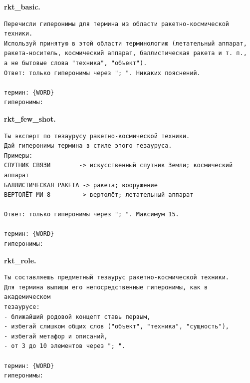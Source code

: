 \documentclass[12pt,a4paper,oneside,openany]{report}
\begin{document}
\textbf{rkt\_basic.}
\begin{verbatim}
Перечисли гиперонимы для термина из области ракетно-космической техники.
Используй принятую в этой области терминологию (летательный аппарат,
ракета-носитель, космический аппарат, баллистическая ракета и т. п.,
а не бытовые слова "техника", "объект").
Ответ: только гиперонимы через "; ". Никаких пояснений.

термин: {WORD}
гиперонимы:
\end{verbatim}

\textbf{rkt\_few\_shot.}
\begin{verbatim}
Ты эксперт по тезаурусу ракетно-космической техники.
Дай гиперонимы термина в стиле этого тезауруса.
Примеры:
СПУТНИК СВЯЗИ        -> искусственный спутник Земли; космический аппарат
БАЛЛИСТИЧЕСКАЯ РАКЕТА -> ракета; вооружение
ВЕРТОЛЁТ МИ-8        -> вертолёт; летательный аппарат

Ответ: только гиперонимы через "; ". Максимум 15.

термин: {WORD}
гиперонимы:
\end{verbatim}

\textbf{rkt\_role.}
\begin{verbatim}
Ты составляешь предметный тезаурус ракетно-космической техники.
Для термина выпиши его непосредственные гиперонимы, как в академическом
тезаурусе:
- ближайший родовой концепт ставь первым,
- избегай слишком общих слов ("объект", "техника", "сущность"),
- избегай метафор и описаний,
- от 3 до 10 элементов через "; ".

термин: {WORD}
гиперонимы:
\end{verbatim}
\end{document}
